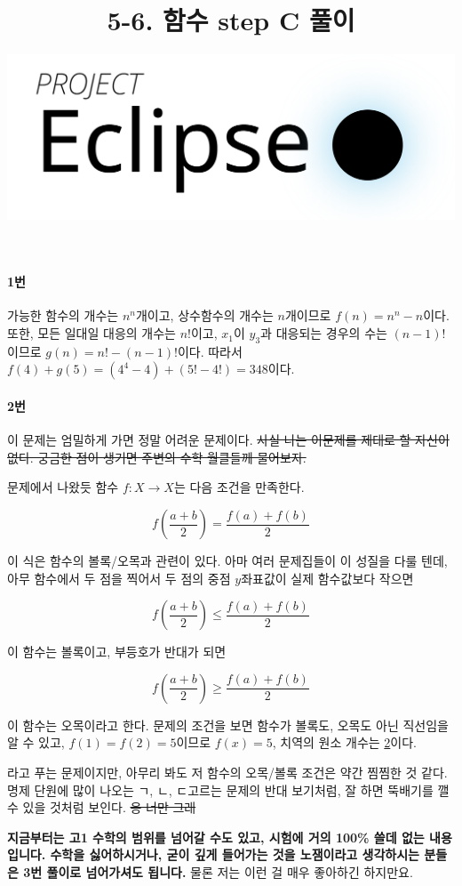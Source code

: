 \documentclass{article}
\title{5-6. 함수 step C 풀이}
\author{
    \includegraphics[scale=0.25]{logo}
}
\date{}
\begin{document}
\maketitle

\paragraph{1번}
가능한 함수의 개수는 $n^n$개이고, 상수함수의 개수는 $n$개이므로 $f(n) = n^n - n$이다. 또한, 모든 일대일 대응의 개수는 $n!$이고, $x_1$이 $y_3$과 대응되는 경우의 수는 $(n - 1)!$이므로 $g(n) = n! - (n - 1)!$이다. 따라서 $f(4) + g(5) = (4^4 - 4) + (5! - 4!) = 348$이다.

\paragraph{2번}
이 문제는 엄밀하게 가면 정말 어려운 문제이다. \sout{사실 나는 이문제를 제대로 할 자신이 없다. 궁금한 점이 생기면 주변의 수학 월클들께 물어보자.} \newline

문제에서 나왔듯 함수 $f: X \longrightarrow X$는 다음 조건을 만족한다.

\[
    f(\frac{a + b}{2}) = \frac{f(a) + f(b)}{2}
\]

이 식은 함수의 볼록/오목과 관련이 있다. 아마 여러 문제집들이 이 성질을 다룰 텐데, 아무 함수에서 두 점을 찍어서 두 점의 중점 $y$좌표값이 실제 함수값보다 작으면

\[
    f(\frac{a + b}{2}) \le \frac{f(a) + f(b)}{2}
\]

이 함수는 볼록이고, 부등호가 반대가 되면

\[
    f(\frac{a + b}{2}) \ge \frac{f(a) + f(b)}{2}
\]

이 함수는 오목이라고 한다. 문제의 조건을 보면 함수가 볼록도, 오목도 아닌 직선임을 알 수 있고, $f(1) = f(2) = 5$이므로 $f(x) = 5$, 치역의 원소 개수는 \underline{2}이다. \newline

라고 푸는 문제이지만, 아무리 봐도 저 함수의 오목/볼록 조건은 약간 찜찜한 것 같다. 명제 단원에 많이 나오는 ㄱ, ㄴ, ㄷ고르는 문제의 반대 보기처럼, 잘 하면 뚝배기를 깰 수 있을 것처럼 보인다. \sout{응 너만 그래} \newline

\textbf{지금부터는 고1 수학의 범위를 넘어갈 수도 있고, 시험에 거의 100\% 쓸데 없는 내용입니다. 수학을 싫어하시거나, 굳이 깊게 들어가는 것을 노잼이라고 생각하시는 분들은 3번 풀이로 넘어가셔도 됩니다.} 물론 저는 이런 걸 매우 좋아하긴 하지만요. \newline
\end{document}
